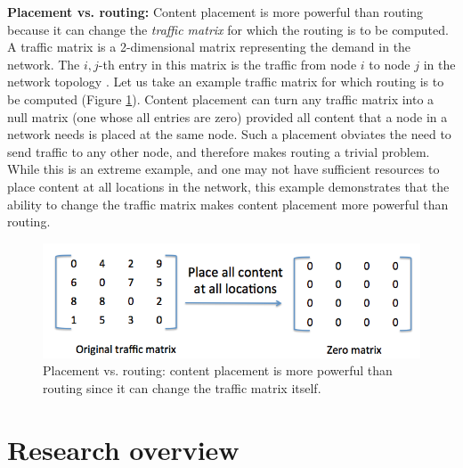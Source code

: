 

\textbf{Placement vs. routing:} Content placement is more powerful than routing because it can change the \emph{traffic matrix} for which the routing is to be computed. A traffic matrix is a 2-dimensional matrix representing the demand in the network. The $i,j$-th entry in this matrix is the traffic from node $i$ to node $j$ in the network topology \cite{fortz2000internet}.  Let us take an example traffic matrix for which routing is to be computed (Figure \ref{fig:placement-routing}). Content placement can turn any traffic matrix into a null matrix (one whose all entries are zero) provided all content that a node in a network needs is placed at the same node. Such a placement obviates the need to send traffic to any other node, and therefore makes routing a trivial problem. While this is an extreme example, and one may not have sufficient resources to place content at all locations in the network, this example demonstrates that the ability to change the traffic matrix makes content placement more powerful than routing.

\begin{figure}
	\centering
	\includegraphics[scale=0.4]{fig/placement-vs-routing.png}
	\caption{Placement vs. routing: content placement is more powerful than routing since it can change the  traffic matrix itself.}
	\label{fig:placement-routing}
\end{figure}


\section{Research overview}

